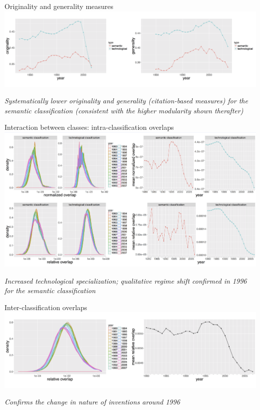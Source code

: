 \documentclass{beamer}
\begin{document}
\begin{frame}{Originality and generality measures}
   \centering
    \includegraphics[width=\textwidth]{figures/Fig6.png}
    
    \medskip
    
    \textit{Systematically lower originality and generality (citation-based measures) for the semantic classification (consistent with the higher modularity shown therafter)}
    
\end{frame}

\begin{frame}{Interaction between classes: intra-classification overlaps}
   \centering
    \includegraphics[width=\textwidth]{figures/Fig7.png}
    
    \medskip

    
    \textit{Increased technological specialization; qualitative regime shift confirmed in 1996 for the semantic classification}
    
\end{frame}

\begin{frame}{Inter-classification overlaps}
   \centering
    \includegraphics[width=\textwidth]{figures/Fig8.png}
    
    \medskip

    \textit{Confirms the change in nature of inventions around 1996} 
    
\end{frame}
\end{document}

